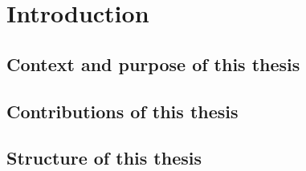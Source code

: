 \chapter{Introduction}
\section{Context and purpose of this thesis}


\section{Contributions of this thesis}


\section{Structure of this thesis}

